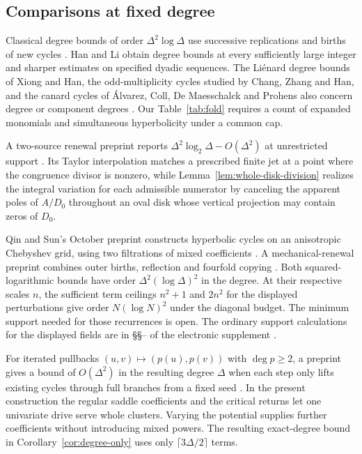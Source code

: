 \subsection{Comparisons at fixed degree}\label{sec:degree-history}
Classical degree bounds of order \(\Delta^2\log\Delta\) use successive replications and births of new cycles \cite{ChristopherLloyd1995,LiChanChung,HanLi2012}. Han and Li obtain degree bounds at every sufficiently large integer and sharper estimates on specified dyadic sequences. The Li\'enard degree bounds of Xiong and Han, the odd-multiplicity cycles studied by Chang, Zhang and Han, and the canard cycles of \'{A}lvarez, Coll, De Maesschalck and Prohens also concern degree or component degrees \cite{XiongHan2014,ChangZhangHan2013,AlvarezEtAl2020}. Our Table~\ref{tab:fold} requires a count of expanded monomials and simultaneous hyperbolicity under a common cap.

A two-source renewal preprint reports \(\Delta^2\log_2\Delta-O(\Delta^2)\) at unrestricted support \cite{LuRenewal}. Its Taylor interpolation matches a prescribed finite jet at a point where the congruence divisor is nonzero, while Lemma~\ref{lem:whole-disk-division} realizes the integral variation for each admissible numerator by canceling the apparent poles of \(A/D_0\) throughout an oval disk whose vertical projection may contain zeros of \(D_0\).

Qin and Sun's October preprint constructs hyperbolic cycles on an anisotropic Chebyshev grid, using two filtrations of mixed coefficients \cite[Theorem~1.1 and \S\S3.2, 6.2--6.3]{QinSun2026}. A mechanical-renewal preprint combines outer births, reflection and fourfold copying \cite[Proposition~3.3]{LuMechanical}. Both squared-logarithmic bounds have order \(\Delta^2(\log\Delta)^2\) in the degree. At their respective scales \(n\), the sufficient term ceilings \(n^2+1\) and \(2n^2\) for the displayed perturbations give order \(N(\log N)^2\) under the diagonal budget. The minimum support needed for those recurrences is open. The ordinary support calculations for the displayed fields are in \S\S{}-- of the electronic supplement \cite{LuElectronic}.

For iterated pullbacks \((u,v)\mapsto(p(u),p(v))\) with \(\deg p\ge2\), a preprint gives a bound of \(O(\Delta^2)\) in the resulting degree \(\Delta\) when each step only lifts existing cycles through full branches from a fixed seed \cite[Theorem~2]{EshkobilovEtAl2026}. In the present construction the regular saddle coefficients and the critical returns let one univariate drive serve whole clusters. Varying the potential supplies further coefficients without introducing mixed powers. The resulting exact-degree bound in Corollary~\ref{cor:degree-only} uses only \(\lceil3\Delta/2\rceil\) terms.
